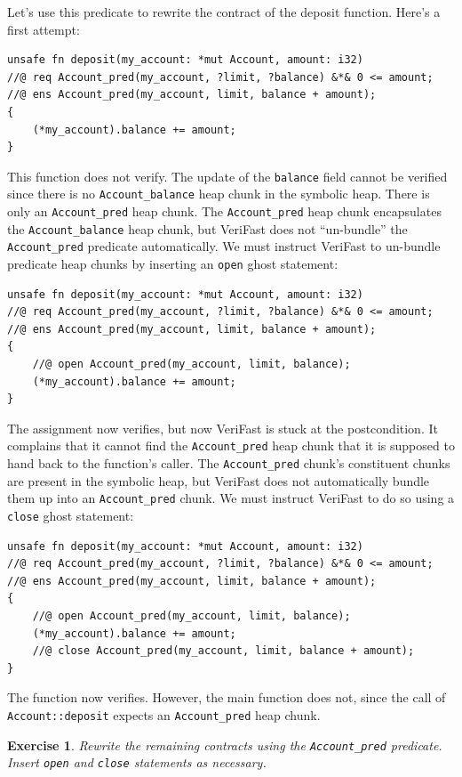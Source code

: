 \documentclass{article}
\newtheorem{exercise}{Exercise}
\begin{document}
Let's use this predicate to rewrite the contract of the deposit function. Here's a first attempt:
\begin{lstlisting}
unsafe fn deposit(my_account: *mut Account, amount: i32)
//@ req Account_pred(my_account, ?limit, ?balance) &*& 0 <= amount;
//@ ens Account_pred(my_account, limit, balance + amount);
{
    (*my_account).balance += amount;
}
\end{lstlisting}
This function does not verify. The update of the
\lstinline!balance! field cannot be verified since there is no
\lstinline!Account_balance! heap chunk in the symbolic heap.
There is only an \lstinline!Account_pred! heap chunk. The
\lstinline!Account_pred! heap chunk encapsulates the
\lstinline!Account_balance! heap chunk, but VeriFast does not
``un-bundle'' the \lstinline!Account_pred! predicate
automatically. We must instruct VeriFast to un-bundle predicate
heap chunks by inserting an \lstinline!open! ghost statement:
\begin{lstlisting}
unsafe fn deposit(my_account: *mut Account, amount: i32)
//@ req Account_pred(my_account, ?limit, ?balance) &*& 0 <= amount;
//@ ens Account_pred(my_account, limit, balance + amount);
{
    //@ open Account_pred(my_account, limit, balance);
    (*my_account).balance += amount;
}
\end{lstlisting}
The assignment now verifies, but now VeriFast is stuck at the
postcondition. It complains that it cannot find the
\lstinline!Account_pred! heap chunk that it is supposed to hand
back to the function's caller. The \lstinline!Account_pred!
chunk's constituent chunks are present in the symbolic heap,
but VeriFast does not automatically bundle them up into an
\lstinline!Account_pred! chunk. We must instruct VeriFast to do
so using a \lstinline!close! ghost statement:
\begin{lstlisting}
unsafe fn deposit(my_account: *mut Account, amount: i32)
//@ req Account_pred(my_account, ?limit, ?balance) &*& 0 <= amount;
//@ ens Account_pred(my_account, limit, balance + amount);
{
    //@ open Account_pred(my_account, limit, balance);
    (*my_account).balance += amount;
    //@ close Account_pred(my_account, limit, balance + amount);
}
\end{lstlisting}
The function now verifies. However, the main function does not,
since the call of \lstinline!Account::deposit! expects an
\lstinline!Account_pred! heap chunk.

\begin{exercise}\label{exercise:pred}
Rewrite the remaining contracts using the
\lstinline!Account_pred! predicate. Insert \lstinline!open! and
\lstinline!close! statements as necessary.
\end{exercise}
\end{document}

